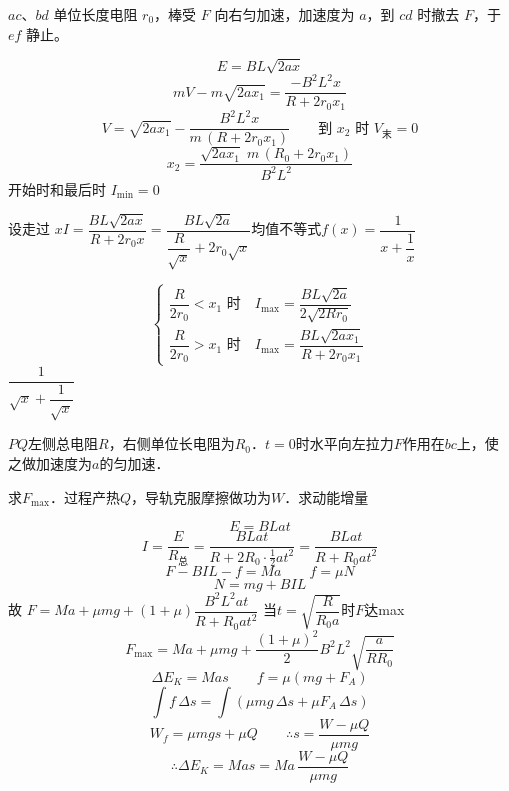 \begin{problem}
$ac$、$bd$ 单位长度电阻 $r_0$，棒受 $F$ 向右匀加速，加速度为 $a$，到 $cd$ 时撤去 $F$，于 $ef$ 静止。
\begin{solution}
\[ E=BL\sqrt{2ax} \]
\[ mV-m\sqrt{2ax_1}=\frac{-B^2L^2x}{R+2r_0x_1} \]
\[ V=\sqrt{2ax_1}-\frac{B^2L^2x}{m\,(R+2r_0x_1)}\qquad \text{到 }x_2\text{ 时 }V_{\text{末}}=0 \]
\[ x_2=\frac{\sqrt{2ax_1}\;m\,(R_0+2r_0x_1)}{B^2L^2} \] %
开始时和最后时 $I_{\min}=0$

设走过 $x$\quad $I=\dfrac{BL\sqrt{2ax}}{R+2r_0x}=\dfrac{BL\sqrt{2a}}{\dfrac{R}{\sqrt{x}}+2r_0\sqrt{x}}$\quad 均值不等式\quad $f(x)=\dfrac{1}{x+\dfrac{1}{x}}$

\[ \left\{\begin{array}{l}
\dfrac{R}{2r_0}<x_1\text{ 时}\quad I_{\max}=\dfrac{BL\sqrt{2a}}{2\sqrt{2Rr_0}}\\[3ex]
\dfrac{R}{2r_0}>x_1\text{ 时}\quad I_{\max}=\dfrac{BL\sqrt{2ax_1}}{R+2r_0x_1}
\end{array}\right. \]
$\dfrac{1}{\sqrt{x}+\dfrac{1}{\sqrt{x}}}$
\end{solution}
\end{problem}

\begin{problem}[2]
$PQ$左侧总电阻$R$，右侧单位长电阻为$R_0$．$t=0$时水平向左拉力$F$作用在$bc$上，使之做加速度为$a$的匀加速．\par
求$F_{\max}$．过程产热$Q$，导轨克服摩擦做功为$W$．求动能增量
\begin{solution}
\[ E=BLat \]
\[ I=\frac{E}{R_{\text{总}}}=\frac{BLat}{R+2R_0\cdot\frac{1}{2}at^2}=\frac{BLat}{R+R_0at^2} \]
\[ F-BIL-f=Ma \qquad f=\mu N \]
\[ N=mg+BIL \]
故 $F=Ma+\mu mg+(1+\mu)\dfrac{B^2L^2at}{R+R_0at^2}$ \quad 当$t=\sqrt{\dfrac{R}{R_0a}}$时$F$达max
\[ F_{\max}=Ma+\mu mg+\frac{(1+\mu)^2}{2}B^2L^2\sqrt{\frac{a}{RR_0}} \] %
\[ \Delta E_K=Mas \qquad f=\mu(mg+F_A) \]
\[ \int f\,\Delta s=\int(\mu mg\,\Delta s+\mu F_A\,\Delta s) \]
\[ W_f=\mu mgs+\mu Q \qquad \therefore s=\frac{W-\mu Q}{\mu mg} \]
\[ \therefore \Delta E_K=Mas=Ma\,\frac{W-\mu Q}{\mu mg} \]
\end{solution}
\end{problem}


